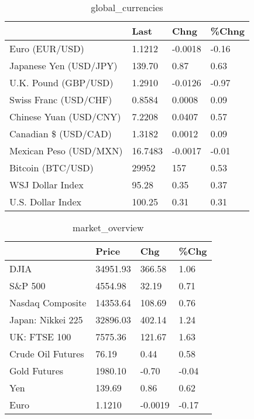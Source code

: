 \documentclass{article}%
\begin{document}
%


\begin{table}[htbp]%
\caption{global\_currencies}%
\centering%
\begin{adjustbox}{width=1\textwidth}%
\begin{tabular}{llll}
\toprule
                       &    Last &    Chng & \%Chng \\
\midrule
        Euro (EUR/USD) &  1.1212 & -0.0018 & -0.16 \\
Japanese Yen (USD/JPY) &  139.70 &    0.87 &  0.63 \\
  U.K. Pound (GBP/USD) &  1.2910 & -0.0126 & -0.97 \\
 Swiss Franc (USD/CHF) &  0.8584 &  0.0008 &  0.09 \\
Chinese Yuan (USD/CNY) &  7.2208 &  0.0407 &  0.57 \\
  Canadian \$ (USD/CAD) &  1.3182 &  0.0012 &  0.09 \\
Mexican Peso (USD/MXN) & 16.7483 & -0.0017 & -0.01 \\
     Bitcoin (BTC/USD) &   29952 &     157 &  0.53 \\
      WSJ Dollar Index &   95.28 &    0.35 &  0.37 \\
     U.S. Dollar Index &  100.25 &    0.31 &  0.31 \\
\bottomrule
\end{tabular}
%
\end{adjustbox}%
\end{table}

%


\begin{table}[htbp]%
\caption{market\_overview}%
\centering%
\begin{adjustbox}{width=1\textwidth}%
\begin{tabular}{llll}
\toprule
                  &    Price &     Chg &  \%Chg \\
\midrule
             DJIA & 34951.93 &  366.58 &  1.06 \\
          S\&P 500 &  4554.98 &   32.19 &  0.71 \\
 Nasdaq Composite & 14353.64 &  108.69 &  0.76 \\
Japan: Nikkei 225 & 32896.03 &  402.14 &  1.24 \\
     UK: FTSE 100 &  7575.36 &  121.67 &  1.63 \\
Crude Oil Futures &    76.19 &    0.44 &  0.58 \\
     Gold Futures &  1980.10 &   -0.70 & -0.04 \\
              Yen &   139.69 &    0.86 &  0.62 \\
             Euro &   1.1210 & -0.0019 & -0.17 \\
\bottomrule
\end{tabular}
%
\end{adjustbox}%
\end{table}

%
\end{document}
